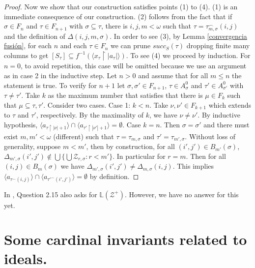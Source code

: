 \documentclass{amsart}
\theoremstyle{definition}
\theoremstyle{remark}
\numberwithin{equation}{section}
\newcommand{\lav}{\mathbb{L}}
\newcommand{\restr}[2]{#1\upharpoonright {#2}}
\begin{document}
\begin{proof}
    Now we show that our construction satisfies points (1) to (4).
    (1) is an immediate consequence of our construction.
   (2) follows from the fact that if $\sigma\in F_n$ and $\tau \in F_{n+1}$ with $\sigma\subseteq \tau$, there is $i,j,m<\omega$ such that $\tau=\tau_{m,\sigma}^\frown(i,j)$ and the definition of $\Delta(i,j,m,\sigma)$.
    In order to see (3), by Lemma \ref{convergencia fusión}, for each $n$ and each $\tau\in F_n$ we can prune $succ_{S}(\tau)$ dropping finite many columns to get $[S_\tau]\subseteq f^{-1}(\langle\restr{x_\tau}{|a_\tau|}\rangle)$.
    To see (4) we proceed by induction. For $n=0$, to avoid repetition, this case will be omitted because we use an argument as in case 2 in the inductive step. Let $n>0$  and assume that for all $m\leq n$ the statement is true. To verify for $n+1$ let $\sigma,\sigma'\in F_{n+1}$,  $\tau\in A_\sigma^0$ and $\tau'\in A_{\sigma'}^0$ with $\tau\neq \tau'$. Take $k$ as the maximum number that satisfies that there is $ \mu\in F_k$ such that $\mu\subseteq \tau,\tau'$. Consider two cases. Case 1: $k<n$.  Take $\nu,\nu'\in F_{k+1}$ which extends to $\tau$ and $\tau'$, respectively. By the maximality of $k$, we have $\nu\neq \nu'$. By inductive hypothesis, $\langle a_{\restr{\tau}{|\nu|+1}} \rangle\cap \langle a_{\restr{\tau'}{|\nu'|+1}} \rangle=\emptyset$. Case $k=n$. Then $\sigma=\sigma'$ and  there must exist $m,m'<\omega$ (different) such that $\tau=\tau_{m,\sigma}$ and $\tau'= \tau_{m',\sigma}$. Without loss of generality, suppose $m<m'$, then by construction, for all $(i',j')\in B_{m'}(\sigma)$, $\Delta_{m',\sigma}(i',j')\notin \bigcup\{\bigcup \mathcal{Z}_{r,\sigma}:r< m'\}$. In particular for $r=m$. Then for all $(i,j)\in B_m(\sigma)$ we have $\Delta_{m',\sigma}(i',j')\neq \Delta_{m,\sigma}(i,j)$. This implies  $\langle a_{\tau^\frown(i,j)} \rangle\cap \langle a_{\tau'^\frown(i',j')} \rangle=\emptyset$ by definition. 
\end{proof}

In \cite{poke}, Question 2.15 also asks for $\lav(\mathcal{Z}^+)$. However, we have no answer for this yet.

\section{Some cardinal invariants related to ideals.}
\end{document}
